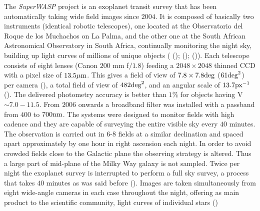 The \textit{SuperWASP} project is an exoplanet transit survey that has been automatically taking wide field images since $2004$. It is composed of basically two instruments (identical robotic telescopes), one located at the Observatorio del Roque de los Muchachos on La Palma, and the other one at the South African Astronomical Observatory in South Africa, continually monitoring the night sky, building up light curves of millions of unique objects ( (\citeyear{2006PASP..118.1407P});  (\citeyear{2008ApJ...675L.113W});  (\citeyear{2010A&A...520L..10B})). Each telescope consists of eight lenses (Canon $200$ mm f$/1.8$) feeding a $2048\times2048$ thinned CCD with a pixel size of $13.5 \mu \textnormal{m}$. This gives a field of view of $7.8\times7.8 \textnormal{deg}$ ($61\textnormal{deg}^2$) per camera  (\citeyear{2010A&A...520L..10B}), a total field of view of $482\textnormal{deg}^2$, and an angular scale of $13.7\textnormal{px}^{-1}$  (\citeyear{2006PASP..118.1407P}). The delivered photometry accuracy is better than $1\%$ for objects having V$\sim7.0-11.5$. From $2006$ onwards a broadband filter was installed with a passband from $400$ to $700\textnormal{nm}$. The systems were designed to monitor fields with high cadence and they are capable of surveying the entire visible sky every $40$ minutes. The observation is carried out in $6$-$8$ fields at a similar declination and spaced apart approximately by one hour in right ascension each night. In order to avoid crowded fields close to the Galactic plane the observing strategy is altered. Thus a large part of mid-plane of the Milky Way galaxy is not sampled. Twice per night the exoplanet survey is interrupted to perform a full sky survey, a process that takes $40$ minutes as was said before  (\citeyear{2010A&A...520L..10B}). Images are taken simultaneously from eight wide-angle cameras in each case throughout the night, offering as main product to the scientific community, light curves of individual stars  (\citeyear{2010A&A...520L..10B})\\    

